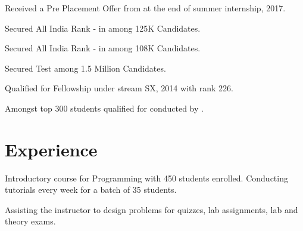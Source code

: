 \documentclass[a4paper]{norm-resume}
\begin{document}
\vspace{3mm} %

\begin{tightitemize}
    \item Received a Pre Placement Offer from {} at the end of summer internship, 2017.
    \item Secured All India Rank -  in {} among 125K Candidates.
    \item Secured All India Rank -  in {} among 108K Candidates.
    \item Secured  Test among 1.5 Million Candidates.
    \item Qualified for  Fellowship under stream SX, 2014 with rank 226.
    \item Amongst top 300 students qualified for  conducted by .
\end{tightitemize}


\vspace{0mm}    %


\section{Experience \hrulefill}

\vspace{1mm} %
  
\begin{tightitemize}
        \small{
        \item Introductory course for Programming with 450 students enrolled. Conducting tutorials every week for a batch of 35 students.
        \item Assisting the instructor to design problems for quizzes, lab assignments, lab and theory exams.
        }
\end{tightitemize}

\vspace{5mm}
\end{document}
